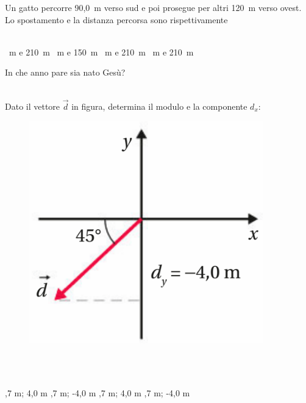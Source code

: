 \documentclass[a4paper,11pt]{exam}
\begin{document}
    

        \begin{center} 
        \end{center}
\begin{questions}

    
\question Un gatto percorre 90,0~m verso sud e poi prosegue per altri 120~m verso ovest. Lo spostamento e la distanza percorsa sono rispettivamente\\\
\begin{oneparchoices}
  ~m e 210~m
  ~m e 150~m
  ~m e 210~m
  \choice 210~m e 210~m
\end{oneparchoices}

    
\question In che anno pare sia nato Gesù?\\\
\begin{oneparchoices}
  \choice -80
\end{oneparchoices}

    
\question Dato il vettore $\vec{d}$ in figura, determina il modulo e la componente $d_x$: \begin{figure}[h!]   \begin{center}     \includegraphics[scale=0.35]{vettored.png}   \end{center} \end{figure}\\\
\begin{oneparchoices}
  ,7 m; 4,0 m
  ,7 m; -4,0 m
  \choice 5,7 m; 4,0 m
  \choice -5,7 m; -4,0 m
\end{oneparchoices}


\end{questions}
\end{document}
